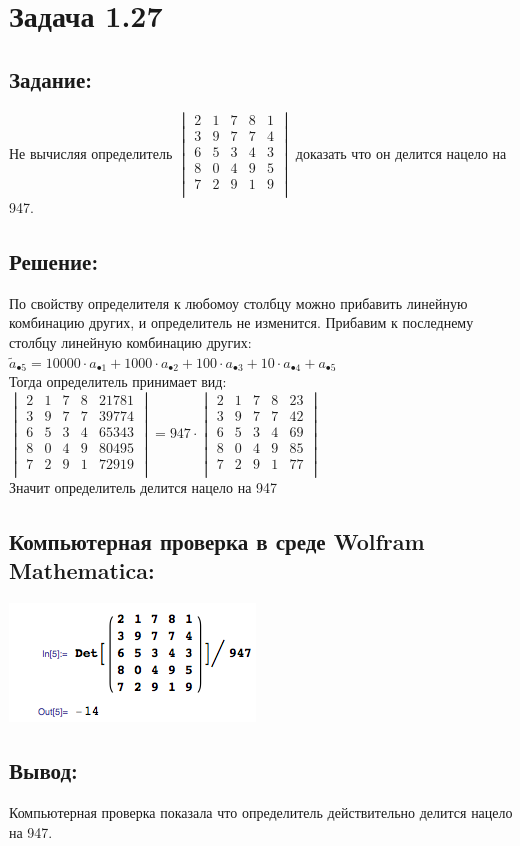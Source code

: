 \section{Задача 1.27}
\subsection{Задание:}
Не вычисляя определитель
$
	\begin{vmatrix}
		2 & 1 & 7 & 8 & 1 \\
		3 & 9 & 7 & 7 & 4 \\
		6 & 5 & 3 & 4 & 3 \\
		8 & 0 & 4 & 9 & 5 \\
		7 & 2 & 9 & 1 & 9 \\
	\end{vmatrix}
$
доказать что он делится нацело на 947.
\subsection{Решение:}
По свойству определителя к любомоу столбцу можно прибавить линейную комбинацию других, и определитель не изменится.
Прибавим к последнему столбцу линейную комбинацию других:
\\
$
	\tilde a_{\bullet 5} =
	10000 \cdot a_{\bullet 1} +
	1000  \cdot a_{\bullet 2} +
	100   \cdot a_{\bullet 3} +
	10    \cdot a_{\bullet 4}
	+ a_{\bullet 5}
$
\\
Тогда определитель принимает вид:
\\[1em]
$
	\begin{vmatrix}
		2 & 1 & 7 & 8 & 21781 \\
		3 & 9 & 7 & 7 & 39774 \\
		6 & 5 & 3 & 4 & 65343 \\
		8 & 0 & 4 & 9 & 80495 \\
		7 & 2 & 9 & 1 & 72919 \\
	\end{vmatrix}
	=
	947 \cdot
	\begin{vmatrix}
		2 & 1 & 7 & 8 & 23 \\
		3 & 9 & 7 & 7 & 42 \\
		6 & 5 & 3 & 4 & 69 \\
		8 & 0 & 4 & 9 & 85 \\
		7 & 2 & 9 & 1 & 77 \\
	\end{vmatrix}
$
\\[1em]
Значит определитель делится нацело на 947
\subsection{Компьютерная проверка в среде Wolfram Mathematica:}
\includegraphics[scale=0.6]{task/1_27/screen1.png}
\subsection{Вывод:}
Компьютерная проверка показала что определитель действительно делится нацело на 947.
